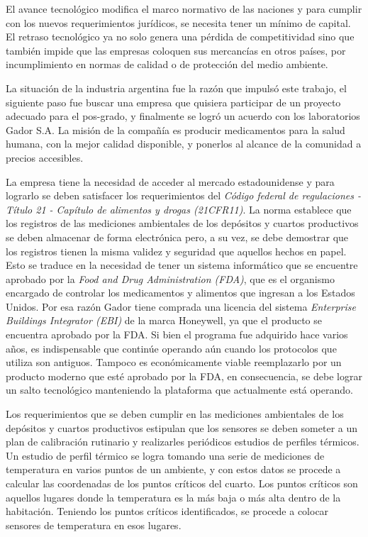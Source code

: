 El avance tecnológico modifica el marco normativo de las naciones y para cumplir con los nuevos requerimientos jurídicos, se necesita tener un mínimo de capital.
El retraso tecnológico ya no solo genera una pérdida de competitividad sino que también impide que las empresas coloquen sus mercancías en otros países, por incumplimiento en normas de calidad o de protección del medio ambiente.
		
La situación de la industria argentina fue la razón que impulsó este trabajo, el siguiente paso fue buscar una empresa que quisiera participar de un proyecto adecuado para el pos-grado, y finalmente se logró un acuerdo con los laboratorios Gador S.A. La misión de la compañía es producir medicamentos para la salud humana, con la mejor calidad disponible, y ponerlos al alcance de la comunidad a precios accesibles. \citep{WEBSITE:Gador}

La empresa tiene la necesidad de acceder al mercado estadounidense y para lograrlo se deben satisfacer los requerimientos del \emph{Código federal de regulaciones - Título 21 - Capítulo de alimentos y drogas (21CFR11)}. \citep{ARTICLE:21cfr11}
La norma establece que los registros de las mediciones ambientales de los depósitos y cuartos productivos se deben almacenar de forma electrónica pero, a su vez, se debe demostrar que los registros tienen la misma validez y seguridad que aquellos hechos en papel. 
Esto se traduce en la necesidad de tener un sistema informático que se encuentre aprobado por la \emph{Food and Drug Administration (FDA)}, que es el organismo encargado de controlar los medicamentos y alimentos que ingresan a los Estados Unidos.
Por esa razón Gador tiene comprada una licencia del sistema \emph{Enterprise Buildings Integrator (EBI)} de la marca Honeywell, ya que el producto se encuentra aprobado por la FDA. 
Si bien el programa fue adquirido hace varios años, es indispensable que continúe operando aún cuando los protocolos que utiliza son antiguos.
Tampoco es económicamente viable reemplazarlo por un producto moderno que esté aprobado por la FDA, en consecuencia, se debe lograr un salto tecnológico manteniendo la plataforma que actualmente está operando.

Los requerimientos que se deben cumplir en las mediciones ambientales de los depósitos y cuartos productivos estipulan que los sensores se deben someter a un plan de calibración rutinario y realizarles periódicos estudios de perfiles térmicos.
Un estudio de perfil térmico se logra tomando una serie de mediciones de temperatura en varios puntos de un ambiente, y con estos datos se procede a calcular las coordenadas de los puntos críticos del cuarto. \citep{ARTICLE:Temperature}
Los puntos críticos son aquellos lugares donde la temperatura es la más baja o más alta dentro de la habitación.
Teniendo los puntos críticos identificados, se procede a colocar sensores de temperatura en esos lugares.

